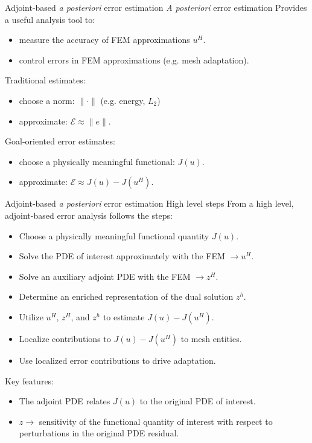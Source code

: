\documentclass[fleqn]{beamer}
\begin{document}

\begin{frame}{Adjoint-based \emph{a posteriori} error estimation}
{\emph{A posteriori} error estimation}
Provides a useful analysis tool to:
\begin{itemize}
\item measure the accuracy of FEM approximations $u^H$.
\item control errors in FEM approximations (e.g. mesh adaptation).
\end{itemize}
Traditional estimates:
\begin{itemize}
\item choose a norm: $\| \cdot \|$ (e.g. energy, $L_2$)
\item approximate: $\mathcal{E} \approx \| e \|$.
\end{itemize}
Goal-oriented error estimates:
\begin{itemize}
\item choose a physically meaningful functional: $J(u)$.
\item approximate: $\mathcal{E} \approx J(u) - J(u^H)$.
\end{itemize}
\end{frame}


\begin{frame}{Adjoint-based \emph{a posteriori} error estimation}
{High level steps}
From a high level, adjoint-based error analysis follows the steps:
\begin{itemize}
\item Choose a physically meaningful functional quantity $J(u)$.
\item Solve the PDE of interest approximately with the FEM $\rightarrow u^H$.
\item Solve an auxiliary adjoint PDE with the FEM $\rightarrow z^H$.
\item Determine an enriched representation of the dual solution $z^h$.
\item Utilize $u^H$, $z^H$, and $z^h$ to estimate $J(u) - J(u^H)$.
\item Localize contributions to $J(u) - J(u^H)$ to mesh entities.
\item Use localized error contributions to drive adaptation.
\end{itemize}
Key features:
\begin{itemize}
\item The adjoint PDE relates $J(u)$ to the original PDE of interest.
\item $z \rightarrow$ sensitivity of the functional quantity of
interest with respect to perturbations in the original PDE residual.
\end{itemize}
\end{frame}
\end{document}
